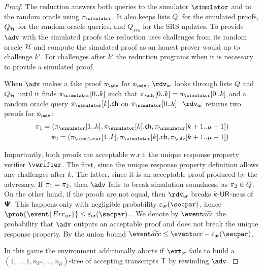 \begin{proof}
	The reduction answers both queries to the simulator $\simulator$ and to the random oracle using $\rsim$. It also keeps lists $Q$, for the simulated proofs, $Q_{\mathcal{H}}$ for the random oracle queries, and $Q_{srs}$ for the SRS updates. To provide $\adv$ with the simulated proofs the reduction uses challenges from its random oracle $\mathcal{H}$ and compute the simulated proof as an honest prover would up to challenge $k'$. For challenges after $k'$ the reduction programs when it is necessary to provide a simulated proof.

	When $\adv$ makes a fake proof $\zkproof_{\adv}$ for $\inp_{\adv}$, $\rdvur$
		looks through lists $Q$ and $Q_{\mathcal{H}}$ until it finds $\zkproof_{\simulator}[0..k]$
		such that $\zkproof_{\adv}[0..k] = \zkproof_{\simulator}[0..k]$ and a random
		oracle query $\zkproof_{\simulator}[k].\ch$ on $\zkproof_{\simulator}[0..k]$.
	$\rdvur$ returns two proofs for $\inp_{\adv}$:
		\begin{align*}
		\zkproof_1 = (\zkproof_{\simulator}[1..k],
		\zkproof_{\simulator}[k].\ch, \zkproof_{\simulator}[k + 1..\mu + 1])\\
		\zkproof_2 = (\zkproof_{\simulator}[1..k],
		\zkproof_{\simulator}[k].\ch, \zkproof_{\adv}[k + 1..\mu + 1])
		\end{align*}

	Importantly, both proofs are acceptable w.r.t~the unique response property verifier $\tilde{\verifier}$. The first, since the unique response property definition allows any challenges after $k$. The latter, since it is an acceptable proof produced by the advresary.
	If $\pi_1 = \pi_2$, then $\adv$ fails to break simulation soundness, as
	$\pi_2 \in Q$. On the other hand, if the proofs are not equal, then $\rdvur$
	breaks ${k\text{-}\mathsf{UR}}$-ness of $\bm{\mathsf{\Psi}}$. This happens only with negligible probability
	$\epsur(\secpar)$, hence \( \prob{\event{\errur}} \leq \epsur(\secpar)\,. \). We denote by $\waccProb$ the probability that $\adv$ outputs an acceptable proof and does not break the unique response property. By the union bound $\waccProb \leq \accProb - \epsur (\secpar)$.

	\iffalse
	 In this game the environment additionally aborts if $\extse$ fails to build a
	$(1, \ldots, 1, n_{k''}, \ldots, n_\mu)$-tree of accepting transcripts $\mathsf{T}$ by rewinding
	$\adv$.
	

\end{proof}
